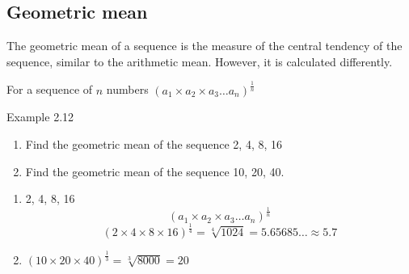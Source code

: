 \subsection{Geometric mean}

The geometric mean of a sequence is the measure of the central tendency of the
sequence, similar to the arithmetic mean. However, it is calculated differently.

For a sequence of $n$ numbers $(a_1 \times a_2 \times a_3 \ldots a_n)^{\frac{1}{n}}$

\begin{example}{Example 2.12}
\begin{enumerate}
  \item Find the geometric mean of the sequence 2, 4, 8, 16
  \item Find the geometric mean of the sequence 10, 20, 40.
\end{enumerate}

\solution
\begin{enumerate}
  \item 2, 4, 8, 16
  \[
    (a_1 \times a_2 \times a_3 \ldots a_n)^{\frac{1}{n}}
  \]
  \[
    (2 \times 4 \times 8 \times 16)^{\frac{1}{4}} = \sqrt[4]{1024} = 5.65685\ldots \approx 5.7
  \]
  \item $(10 \times 20 \times 40)^{\frac{1}{3}} = \sqrt[3]{8000} = 20$
\end{enumerate}
\end{example}
